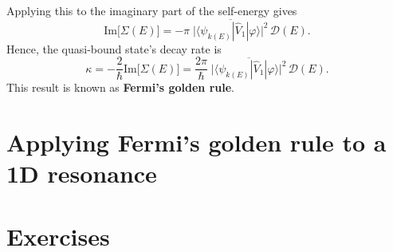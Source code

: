 \documentclass[pra,12pt]{revtex4}
\begin{document}
Applying this to the imaginary part of the self-energy gives
$$\mathrm{Im}\big[\Sigma(E)\big] = - \pi \; \overline{\Big| \langle\psi_{k(E)}| \hat{V}_1|\varphi\rangle\Big|^2} \, \mathcal{D}(E).$$
Hence, the quasi-bound state's decay rate is
$$\boxed{\quad\kappa = -\frac{2}{\hbar}\mathrm{Im}\big[\Sigma(E)\big] = \frac{2\pi}{\hbar} \; \overline{\Big| \langle\psi_{k(E)}| \hat{V}_1|\varphi\rangle\Big|^2} \, \mathcal{D}(E).\quad}$$
This result is known as \textbf{Fermi's golden rule}.


\section{Applying Fermi's golden rule to a 1D resonance}

\section*{Exercises}
\end{document}
